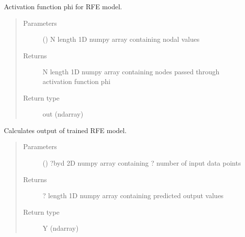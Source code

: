 \documentclass[letterpaper,10pt,english]{sphinxmanual}
\begin{document}
\begin{fulllineitems}
\begin{fulllineitems}
\label{\detokenize{rom:rom.response_surfaces.RFE.phi}}
\sphinxAtStartPar
Activation function phi for RFE model.
\begin{quote}\begin{description}
\item[{Parameters}] \leavevmode
\sphinxAtStartPar
{} () \textendash{} N length 1D numpy array containing nodal values

\item[{Returns}] \leavevmode
\sphinxAtStartPar
N length 1D numpy array containing nodes passed through activation function phi

\item[{Return type}] \leavevmode
\sphinxAtStartPar
out (ndarray)

\end{description}\end{quote}

\end{fulllineitems}


\begin{fulllineitems}
\label{\detokenize{rom:rom.response_surfaces.RFE.predict}}
\sphinxAtStartPar
Calculates output of trained RFE model.
\begin{quote}\begin{description}
\item[{Parameters}] \leavevmode
\sphinxAtStartPar
{} () \textendash{} ?\sphinxhyphen{}by\sphinxhyphen{}d 2D numpy array containing ? number of input data points

\item[{Returns}] \leavevmode
\sphinxAtStartPar
? length 1D numpy array containing predicted output values

\item[{Return type}] \leavevmode
\sphinxAtStartPar
Y (ndarray)

\end{description}\end{quote}


\end{fulllineitems}
\end{fulllineitems}
\end{document}
